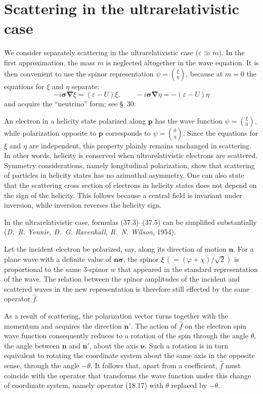 \section{Scattering in the ultrarelativistic case}

We consider separately scattering in the ultrarelativistic case ($\varepsilon\gg m$). In the first approximation, the mass $m$ is neglected altogether in the wave equation. It is then convenient to use the spinor representation $\psi=\binom{\xi}{\eta}$, because at $m=0$ the equations for $\xi$ and $\eta$ separate:
\begin{equation}
-i\boldsymbol\sigma\boldsymbol\nabla\xi=(\varepsilon-U)\xi,
\qquad
-i\boldsymbol\sigma\boldsymbol\nabla\eta=-(\varepsilon-U)\eta
\tag{38.1}
\end{equation}
and acquire the ``neutrino'' form; see \S~30.

An electron in a helicity state polarized along $\mathbf p$ has the wave function $\psi=\binom{\xi}{0}$, while polarization opposite to $\mathbf p$ corresponds to $\psi=\binom{0}{\eta}$. Since the equations for $\xi$ and $\eta$ are independent, this property plainly remains unchanged in scattering. In other words, helicity is conserved when ultrarelativistic electrons are scattered. Symmetry considerations, namely longitudinal polarization, show that scattering of particles in helicity states has no azimuthal asymmetry. One can also state that the scattering cross section of electrons in helicity states does not depend on the sign of the helicity. This follows because a central field is invariant under inversion, while inversion reverses the helicity sign.

In the ultrarelativistic case, formulas (37.3)--(37.5) can be simplified substantially (\emph{D.~R. Yennie, D.~G. Ravenhall, R.~N. Wilson}, 1954).

Let the incident electron be polarized, say, along its direction of motion $\mathbf n$. For a plane wave with a definite value of $\mathbf n\boldsymbol\sigma$, the spinor $\xi\,(=(\varphi+\chi)/\sqrt2)$ is proportional to the same 3-spinor $w$ that appeared in the standard representation of the wave. The relation between the spinor amplitudes of the incident and scattered waves in the new representation is therefore still effected by the same operator $\widehat f$.

As a result of scattering, the polarization vector turns together with the momentum and acquires the direction $\mathbf n'$. The action of $\widehat f$ on the electron spin wave function consequently reduces to a rotation of the spin through the angle $\theta$, the angle between $\mathbf n$ and $\mathbf n'$, about the axis $\boldsymbol\nu$. Such a rotation is in turn equivalent to rotating the coordinate system about the same axis in the opposite sense, through the angle $-\theta$. It follows that, apart from a coefficient, $\widehat f$ must coincide with the operator that transforms the wave function under this change of coordinate system, namely operator (18.17) with $\theta$ replaced by $-\theta$.

